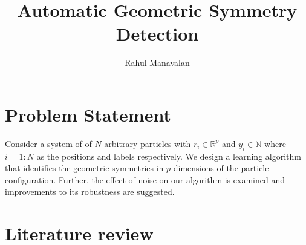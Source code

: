\documentclass{article}
\title{Automatic Geometric Symmetry Detection}
\author{Rahul Manavalan}
\date{}
\begin{document}
\maketitle

\section{Problem Statement}
Consider a system of of $N$ arbitrary particles with $r_{i} \in \mathbb{R}^{p}$ and $y_{i} \in \mathbb{N}$ where $i=1:N$ as the positions and labels respectively.
We design a learning algorithm that identifies the geometric symmetries in $p$ dimensions of the particle configuration.
Further, the effect of noise on our algorithm is examined and improvements to its robustness are suggested.

\section{Literature review}


\end{document}
